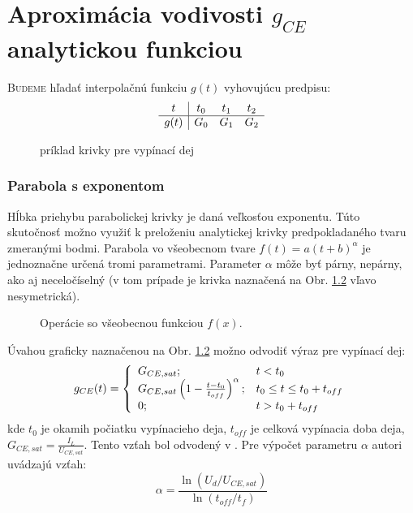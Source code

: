 \chapter{Aproximácia vodivosti $g_{CE}$ analytickou funkciou} \label{ch:krivka}

\lettrine{B}{udeme} hľadať interpolačnú funkciu $g(t)$ vyhovujúcu predpisu:
\begin{equation}
	\begin{array}{c | c c c}
		t & t_0 & t_1 & t_2 \\
		\hline
		g(t) & G_0 & G_1 & G_2
	\end{array}
	\label{eq:tab_predpis_t012}
\end{equation}

\begin{figure}[ht!]
	\centering
	
	\caption{príklad krivky pre vypínací dej}
	\label{fig:krivka_vyp_t012}
\end{figure}


\subsection{Parabola s  exponentom}
Hĺbka priehybu parabolickej krivky je daná veľkosťou exponentu. Túto skutočnosť možno využiť k preloženiu analytickej krivky predpokladaného tvaru zmeranými bodmi. Parabola vo všeobecnom tvare $f(t)=a(t+b)^\alpha$ je jednoznačne určená tromi parametrami. Parameter $\alpha$ môže byť párny, nepárny, ako aj neceločíselný (v tom prípade je krivka naznačená na Obr. \ref{fig:patocka_fxfmxfmxpb} vľavo nesymetrická).
\begin{figure}[ht!]
	\centering
	
	\caption{Operácie so všeobecnou funkciou $f(x)$.}
	\label{fig:patocka_fxfmxfmxpb}
\end{figure}

Úvahou graficky naznačenou na Obr. \ref{fig:patocka_fxfmxfmxpb} možno odvodiť výraz pre vypínací dej:
\begin{equation}
	g_{CE}(t) = 
	\left\{
	\begin{array}{l l}
		G_{CE,sat};	& t<t_0 \\
		G_{CE,sat} \left( 1 - \frac{t-t_0}{t_{off}} \right)^\alpha;	& t_0 \leq t \leq t_0+t_{off} \\
		0;		& t > t_0+t_{off}
	\end{array}
	\right.
	\label{eq:gCE_patocka_valsa}
\end{equation}
kde $t_0$ je okamih počiatku vypínacieho deja, $t_{off}$ je celková vypínacia doba deja, $G_{CE,sat} = \frac{I_L}{U_{CE,sat}}$.
Tento vzťah bol odvodený v \cite{valsa-patocka-petru}. Pre výpočet parametru $\alpha$ autori uvádzajú vzťah:
\begin{equation}
	\alpha = \frac{\ln\left( U_d / U_{CE,sat} \right)}{\ln\left( t_{off} / t_f \right)}
	\label{eq:patocka_alpha}
\end{equation}


